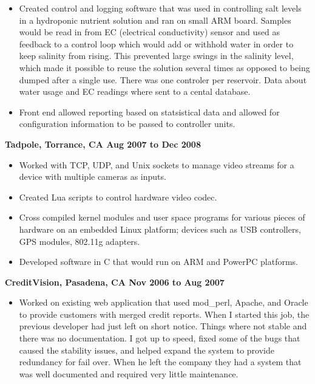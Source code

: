 \documentclass{res}
\begin{document}
\begin{resume}
\begin{itemize}
\item
	Created control and logging software that was used in controlling
	salt levels in a hydroponic nutrient solution and ran on
	small ARM board.  Samples would be read in from EC (electrical
	conductivity) sensor and used as feedback to a control loop which
	would add or withhold water in order to keep salinity from rising.
	This prevented large swings in the salinity level, which made
	it possible to reuse the solution several times as opposed to
	being dumped after a single use.  There was one controler per
	reservoir.  Data about water usage and EC readings where sent
	to a cental database.

\item
	Front end allowed reporting based on statsistical data and allowed
	for configuration information to be passed to controller units.

\end{itemize}

{\large \bf Tadpole, Torrance, CA \hfill Aug 2007 to Dec 2008}

\begin{itemize}

\item
	Worked with TCP, UDP, and Unix sockets to manage video streams
	for a device with multiple cameras as inputs.

\item
	Created Lua scripts to control hardware video codec.

\item
	Cross compiled kernel modules and user space programs for various
	pieces of hardware on an embedded Linux platform; devices such
	as USB controllers, GPS modules, 802.11g adapters.

\item
	Developed software in C that would run on ARM and PowerPC platforms.

\end{itemize}

{\large \bf CreditVision, Pasadena, CA \hfill Nov 2006 to Aug 2007}

\begin{itemize}

\item
	Worked on existing web application that used mod\_perl, Apache,
	and Oracle to provide customers with merged credit reports.
	When I started this job, the previous developer had just
	left on short notice.  Things where not stable and there was
	no documentation.  I got up to speed, fixed some of the bugs
	that caused the stability issues, and helped expand the system
	to provide redundancy for fail over.  When he left the company
	they had a system that was well documented and required very
	little maintenance.


\end{itemize}
\end{resume}
\end{document}

